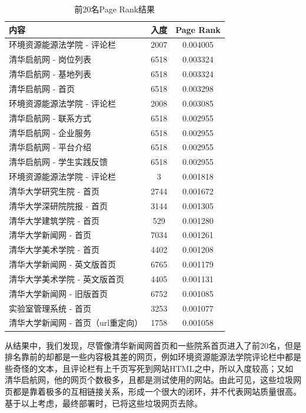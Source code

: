 \documentclass[paper=a4, fontsize=11pt, UTF8]{article} %
\numberwithin{equation}{section} %
\numberwithin{figure}{section} %
\numberwithin{table}{section} %
\begin{document}
\begin{table}[htp]
\centering
\begin{tabular}{@{}lcc@{}}
\toprule
内容                   & 入度   & Page Rank \\ \midrule
环境资源能源法学院 - 评论栏      & 2007 & 0.004005  \\
清华启航网 - 岗位列表         & 6518 & 0.003324  \\
清华启航网 - 基地列表         & 6518 & 0.003324  \\
清华启航网 - 首页           & 6518 & 0.003298  \\
环境资源能源法学院 - 评论栏      & 2008 & 0.003085  \\
清华启航网 - 联系方式         & 6518 & 0.002955  \\
清华启航网 - 企业服务         & 6518 & 0.002955  \\
清华启航网 - 平台介绍         & 6518 & 0.002955  \\
清华启航网 - 学生实践反馈       & 6518 & 0.002955  \\
环境资源能源法学院 - 评论栏      & 3    & 0.001818  \\
清华大学研究生院 - 首页        & 2744 & 0.001672  \\
清华大学深研院院报 - 首页       & 3144 & 0.001305  \\
清华大学建筑学院 - 首页        & 529  & 0.001280  \\
清华大学新闻网 - 首页         & 7034 & 0.001261  \\
清华大学美术学院 - 首页        & 4402 & 0.001208  \\
清华大学新闻网 - 英文版首页      & 6765 & 0.001179  \\
清华大学美术学院 - 英文版首页     & 4405 & 0.001131  \\
清华大学新闻网 - 旧版首页       & 6752 & 0.001085  \\
实验室管理系统 - 首页         & 3253 & 0.001077  \\
清华大学新闻网 - 首页（url重定向） & 1758 & 0.001058  \\ \bottomrule
\end{tabular}
\caption{前20名Page Rank结果}\label{table1}
\end{table}

从结果中，我们发现，尽管像清华新闻网首页和一些院系首页进入了前20名，但是排名靠前的却都是一些内容极其差的网页，例如环境资源能源法学院评论栏中都是些奇怪的文本，且评论栏有上千页写死到网站HTML之中，所以入度较高；又如清华启航网，他的网页个数极多，且都是测试使用的网站。由此可见，这些垃圾网页都是靠着极多的互相链接关系，形成一个很大的闭环，并不代表网站质量很高。基于以上考虑，最终部署时，已将这些垃圾网页去除。
\end{document}
